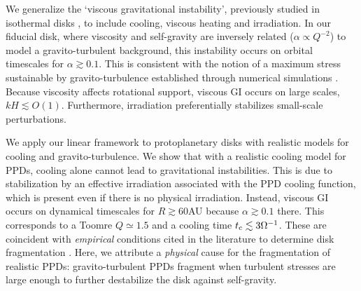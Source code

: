 We generalize the `viscous gravitational instability', previously 
studied in isothermal disks
\citep{lynden-bell74,willerding92,gammie96}, to include 
cooling, viscous heating and irradiation. In our fiducial disk,  
where viscosity and self-gravity are inversely
related ($\alpha\propto Q^{-2}$) to model a
gravito-turbulent background, this instability occurs on orbital  
timescales for $\alpha\gtrsim 0.1$. This is consistent with the notion
of a maximum stress sustainable by gravito-turbulence established
through numerical simulations \citep{rice05}. Because viscosity affects 
rotational support, viscous GI occurs on large scales, $kH\lesssim
O(1)$.  Furthermore, irradiation preferentially
stabilizes small-scale perturbations. %
                             

We apply our linear framework to protoplanetary disks with 
realistic models for cooling and gravito-turbulence. 
We show that with a realistic cooling model for PPDs,
cooling alone cannot lead to gravitational instabilities. This is due
to stabilization by an effective irradiation associated with the PPD
cooling function, which is present even if 
there is no physical irradiation. %
Instead, viscous GI occurs on  
dynamical timescales for $R\gtrsim 60$AU because 
$\alpha\gtrsim0.1$ there. This corresponds to a Toomre $Q\simeq 1.5$ and 
a cooling time $t_\mathrm{c}\lesssim 3\Omega^{-1}$. These are coincident with 
\emph{empirical} conditions cited in the literature to determine disk
fragmentation 
\citep[e.g.][]{rafikov15}. Here, we attribute a \emph{physical}
cause for the fragmentation of realistic PPDs: gravito-turbulent PPDs
fragment when turbulent stresses are large enough to further
destabilize the disk against self-gravity.    

